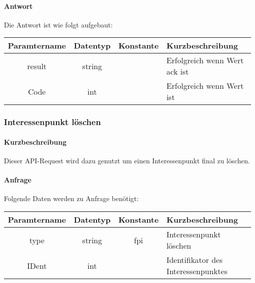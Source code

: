 \paragraph{Antwort}Die Antwort ist wie folgt aufgebaut:
\begin{table}[H]
	\begin{tabular}{|c|c|c|p{6.5cm}|}
		\hline
		\textbf{Paramtername} & \textbf{Datentyp} & \textbf{Konstante} & \textbf{Kurzbeschreibung}                                                                                               \\ \hline
		result              & string           &                 & Erfolgreich wenn Wert {\glqq ack\grqq} ist \\ \hline
		Code                & int              &                 & Erfolgreich wenn Wert {\glqq 0\grqq} ist \\ \hline
	\end{tabular}
\end{table}
\subsubsection{Interessenpunkt löschen}
\paragraph{Kurzbeschreibung}Dieser API-Request wird dazu genutzt um einen Interessenpunkt final zu löschen.
\paragraph{Anfrage}Folgende Daten werden zu Anfrage benötigt:
\begin{table}[H]
	\begin{tabular}{|c|c|c|p{6.5cm}|}
		\hline
		\textbf{Paramtername} & \textbf{Datentyp} & \textbf{Konstante} & \textbf{Kurzbeschreibung}                                                                                               \\ \hline
		type                & string            & fpi                & Interessenpunkt löschen \\ \hline
		IDent               & int               &                    & Identifikator des Interessenpunktes \\ \hline
	\end{tabular}
\end{table}
